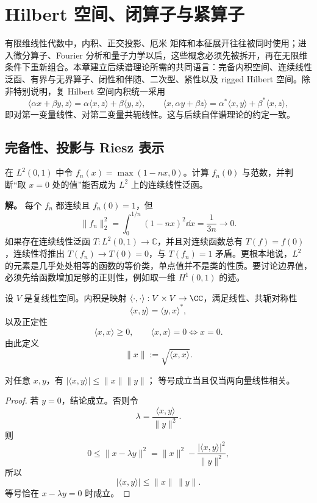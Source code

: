 \chapter{Hilbert 空间、闭算子与紧算子}\label{ch:ms-hilbert-operators}\label{chap:hilbert-space} \label{chap:math-hilbert}

有限维线性代数中，内积、正交投影、厄米 矩阵和本征展开往往被同时使用；进入微分算子、Fourier 分析和量子力学以后，这些概念必须先被拆开，再在无限维条件下重新组合。本章建立后续谱理论所需的共同语言：完备内积空间、连续线性泛函、有界与无界算子、闭性和伴随、二次型、紧性以及 rigged Hilbert 空间。除非特别说明，复 Hilbert 空间内积统一采用
\[
\boxed{\langle \alpha x+\beta y,z\rangle
=\alpha\langle x,z\rangle+\beta\langle y,z\rangle},
\qquad
\langle x,\alpha y+\beta z\rangle
=\alpha^*\langle x,y\rangle+\beta^*\langle x,z\rangle,
\]
即对第一变量线性、对第二变量共轭线性。这与后续自伴谱理论的约定一致。



\section{完备性、投影与 Riesz 表示}

\begin{workedexample}[\(L^2\) 函数不能按点取值]
在 \(L^2(0,1)\) 中令 \(f_n(x)=\max(1-nx,0)\)。计算 \(f_n(0)\) 与范数，并判断“取 \(x=0\) 处的值”能否成为 \(L^2\) 上的连续线性泛函。

\textbf{解。} 每个 \(f_n\) 都连续且 \(f_n(0)=1\)，但
\[
\|f_n\|_2^2=\int_0^{1/n}(1-nx)^2\dd x
=\frac1{3n}\longrightarrow0.
\]
如果存在连续线性泛函 \(T:L^2(0,1)\to\mathbb C\)，并且对连续函数总有 \(T(f)=f(0)\)，连续性将推出 \(T(f_n)\to T(0)=0\)，与 \(T(f_n)=1\) 矛盾。更根本地说，\(L^2\) 的元素是几乎处处相等的函数的等价类，单点值并不是类的性质。要讨论边界值，必须先给函数增加足够的正则性，例如取一维 \(H^1(0,1)\) 的迹。
\end{workedexample}

\begin{definition}[内积与诱导范数]
设 $V$ 是复线性空间。内积是映射 $\langle\cdot,\cdot\rangle:V\times V\to\CC$，满足线性、共轭对称性
\[
\langle x,y\rangle=\langle y,x\rangle^*,
\]
以及正定性
\[
\langle x,x\rangle\ge0,
\qquad
\langle x,x\rangle=0\iff x=0.
\]
由此定义
\[
\|x\|:=\sqrt{\langle x,x\rangle}.
\]
\end{definition}

\begin{theorem}
对任意 $x,y$，有 $|\langle x,y\rangle|\le\|x\|\|y\|$；
等号成立当且仅当两向量线性相关。
\end{theorem}
\begin{proof}
若 $y=0$，结论成立。否则令
\[
\lambda=\frac{\langle x,y\rangle}{\|y\|^2}.
\]
则
\[
0\le \|x-\lambda y\|^2
=\|x\|^2-\frac{|\langle x,y\rangle|^2}{\|y\|^2},
\]
所以
\[
\boxed{|\langle x,y\rangle|\le \|x\|\,\|y\|}.
\]
等号恰在 $x-\lambda y=0$ 时成立。
\end{proof}

